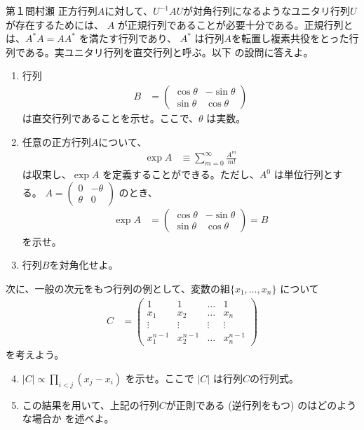 \begin{question}{第１問}{村瀬}
正方行列$A$に対して、$U^{-1}AU$が対角行列になるようなユニタリ行列$U$が存在するためには、
$A$ が正規行列であることが必要十分である。正規行列とは、$A^*A=AA^*$ を満たす行列であり、
$A^*$ は行列$A$を転置し複素共役をとった行列である。実ユニタリ行列を直交行列と呼ぶ。以下
の設問に答えよ。
\begin{enumerate}
\item
  行列
  \begin{align*}
    B &= \begin{pmatrix}
      \cos\theta & -\sin\theta \\
      \sin\theta & \cos\theta
    \end{pmatrix}
  \end{align*}
  は直交行列であることを示せ。ここで、$\theta$ は実数。

\item
  任意の正方行列$A$について、
  \begin{align*}
    \exp A &\equiv \sum_{m=0}^\infty \frac{A^m}{m!}
  \end{align*}
  は収束し、$\exp A$ を定義することができる。ただし、$A^0$ は単位行列とする。
  $A=\begin{pmatrix} 0 & -\theta \\ \theta & 0 \end{pmatrix}$ のとき、
  \begin{align*}
    \exp A &= \begin{pmatrix}
      \cos\theta & -\sin\theta\\
      \sin\theta & \cos\theta
    \end{pmatrix} = B
  \end{align*}
  を示せ。

\item
  行列$B$を対角化せよ。
\end{enumerate}
次に、一般の次元をもつ行列の例として、変数の組$\{x_1,\ldots,x_n\}$ について
\begin{align*}
  C &= \begin{pmatrix}
    1 & 1 & \ldots & 1\\
    x_1 & x_2 & \ldots & x_n\\
    \vdots & \vdots & \vdots & \vdots\\
    x_1^{n-1} & x_2^{n-1} & \ldots & x_n^{n-1}
  \end{pmatrix}
\end{align*}
を考えよう。

\begin{enumerate}\setcounter{enumi}{3}
\item
  $|C|\propto\prod_{i<j}(x_j-x_i)$ を示せ。ここで $|C|$ は行列$C$の行列式。
\item
  この結果を用いて、上記の行列$C$が正則である (逆行列をもつ) のはどのような場合か
  を述べよ。
\end{enumerate}
\end{question}
